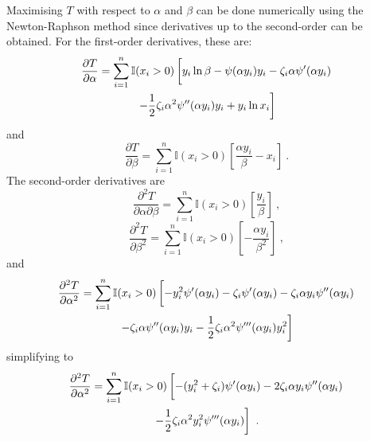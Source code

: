Maximising $T$ with respect to $\alpha$ and $\beta$ can be done numerically using the Newton-Raphson method since derivatives up to the second-order can be obtained. For the first-order derivatives, these are:
\begin{multline}
  \frac{\partial T}{\partial \alpha} =
  \sum_{i=1}^n\mathbb{I}(x_i>0)
  \left[
    y_i\ln\beta -\psi(\alpha y_i)y_i-\zeta_i\alpha\psi'(\alpha y_i)
    \vphantom{\frac{1}{1}}
  \right.
  \\
  \left.
    - \frac{1}{2}\zeta_i\alpha^2\psi''(\alpha y_i)y_i + y_i\ln x_i
  \right]
\end{multline}
and
\begin{equation}
  \frac{\partial T}{\partial \beta} = \sum_{i=1}^n\mathbb{I}(x_i>0)\left[
  \frac{\alpha y_i}{\beta}-x_i
  \right]
  \ .
\end{equation}
The second-order derivatives are
\begin{equation}
  \frac{\partial^2 T}{\partial \alpha \partial \beta} =
  \sum_{i=1}^n \mathbb{I}(x_i>0)\left[\frac{y_i}{\beta}\right]
  \ ,
  \label{eq:compoundPoisson:d2tdadb}
\end{equation}
\begin{equation}
  \frac{\partial^2 T}{\partial \beta^2} = \sum_{i=1}^n\mathbb{I}(x_i>0)\left[-\frac{\alpha y_i}{\beta^2}
  \right]
  \ ,
  \label{eq:compoundPoisson:d2td2b}
\end{equation}
and
\begin{multline*}
  \frac{\partial^2 T}{\partial \alpha^2} = 
  \sum_{i=1}^n\mathbb{I}(x_i>0)
  \left[
    -y_i^2\psi'(\alpha y_i) - \zeta_i\psi'(\alpha y_i) - \zeta_i\alpha y_i\psi''(\alpha y_i)
    \vphantom{\frac{1}{2}}\right.\\\left. 
    - \zeta_i\alpha\psi''(\alpha y_i)y_i
    -\frac{1}{2}\zeta_i\alpha^2\psi'''(\alpha y_i)y_i^2
  \right]
\end{multline*}
simplifying to
\begin{multline}
  \frac{\partial^2 T}{\partial \alpha^2} = 
  \sum_{i=1}^n\mathbb{I}(x_i>0)
  \left[
    -(y_i^2+\zeta_i)\psi'(\alpha y_i) - 2\zeta_i\alpha y_i\psi''(\alpha y_i)
    \vphantom{\frac{1}{2}}
  \right.
  \\
  \left.  
    -\frac{1}{2}\zeta_i\alpha^2y_i^2\psi'''(\alpha y_i)
  \right] \ .
  \label{eq:compoundPoisson:d2td2a}
\end{multline}

